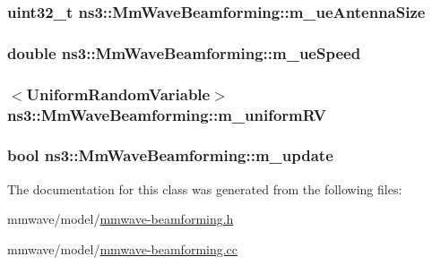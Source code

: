\subsubsection[{\texorpdfstring{m\+\_\+ue\+Antenna\+Size}{m_ueAntennaSize}}]{\setlength{\rightskip}{0pt plus 5cm}uint32\+\_\+t ns3\+::\+Mm\+Wave\+Beamforming\+::m\+\_\+ue\+Antenna\+Size\hspace{0.3cm}{\ttfamily [private]}}\hypertarget{classns3_1_1MmWaveBeamforming_a1debaf83bab520b89e80f333841dfe93}{}\label{classns3_1_1MmWaveBeamforming_a1debaf83bab520b89e80f333841dfe93}
\subsubsection[{\texorpdfstring{m\+\_\+ue\+Speed}{m_ueSpeed}}]{\setlength{\rightskip}{0pt plus 5cm}double ns3\+::\+Mm\+Wave\+Beamforming\+::m\+\_\+ue\+Speed\hspace{0.3cm}{\ttfamily [private]}}\hypertarget{classns3_1_1MmWaveBeamforming_a11796c9c9b2df2d24fe99e7e5817cd20}{}\label{classns3_1_1MmWaveBeamforming_a11796c9c9b2df2d24fe99e7e5817cd20}
\subsubsection[{\texorpdfstring{m\+\_\+uniform\+RV}{m_uniformRV}}]{$<${\bf Uniform\+Random\+Variable}$>$ ns3\+::\+Mm\+Wave\+Beamforming\+::m\+\_\+uniform\+RV\hspace{0.3cm}{\ttfamily [private]}}\hypertarget{classns3_1_1MmWaveBeamforming_acde578460be1bc261748dde89e1a9cc4}{}\label{classns3_1_1MmWaveBeamforming_acde578460be1bc261748dde89e1a9cc4}
\subsubsection[{\texorpdfstring{m\+\_\+update}{m_update}}]{\setlength{\rightskip}{0pt plus 5cm}bool ns3\+::\+Mm\+Wave\+Beamforming\+::m\+\_\+update\hspace{0.3cm}{\ttfamily [private]}}\hypertarget{classns3_1_1MmWaveBeamforming_abb587108615acddd1438879730658dad}{}\label{classns3_1_1MmWaveBeamforming_abb587108615acddd1438879730658dad}


The documentation for this class was generated from the following files\+:\begin{DoxyCompactItemize}
\item 
mmwave/model/\hyperlink{mmwave-beamforming_8h}{mmwave-\/beamforming.\+h}\item 
mmwave/model/\hyperlink{mmwave-beamforming_8cc}{mmwave-\/beamforming.\+cc}\end{DoxyCompactItemize}
